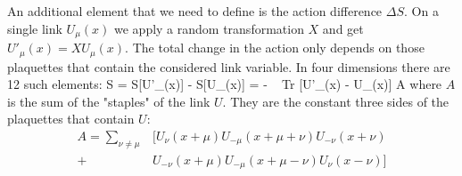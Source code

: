 An additional element that we need to define is the action difference $\Delta S$. On a single link $U_\mu(x)$ we apply a random transformation $X$ and get $U'_\mu(x) = XU_\mu(x)$. The total change in the action only depends on those plaquettes that contain the considered link variable. In four dimensions there are 12 such elements:
\beq
    \Delta S = S[U'_\mu(x)] - S[U_\mu(x)]  = - \Re~ Tr [U'_\mu(x) - U_\mu(x)] A
\eeq
where $A$ is the sum of the "staples" of the link $U$. They are the constant three sides of the plaquettes that contain $U$:
\begin{align}
    A = \sum_{\nu\neq\mu} &\bigg[ U_{\nu}(x+\mu)U_{-\mu}(x+\mu+\nu)U_{-\nu}(x+\nu) \\\nonumber
    +  &U_{-\nu}(x+\mu)U_{-\mu}(x+\mu-\nu)U_{\nu}(x-\nu)  \bigg]
\end{align}

